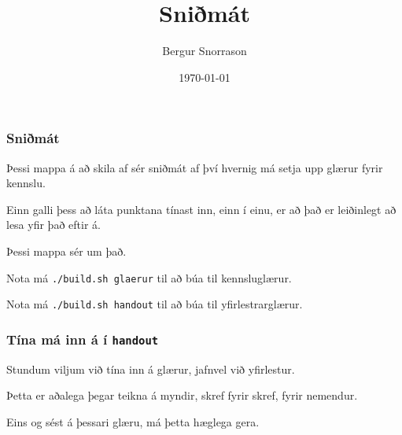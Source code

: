 \title{Sniðmát}
\author{Bergur Snorrason}
\date{\today}



\frame{\titlepage}

{
	\frametitle{Sniðmát}
	{
		\item<1-> Þessi mappa á að skila af sér sniðmát af því hvernig má setja upp glærur fyrir kennslu.
		\item<3-> Einn galli þess að láta punktana tínast inn, einn í einu, er að það er leiðinlegt að lesa yfir það eftir á.
		\item<5-> Þessi mappa sér um það.
		\item<6-> Nota má \texttt{./build.sh glaerur} til að búa til kennsluglærur.
		\item<7-> Nota má \texttt{./build.sh handout} til að búa til yfirlestrarglærur.
	}
}

{
	\frametitle{Tína má inn á í \texttt{handout}}
	{
		\item<all:1-> Stundum viljum við tína inn á glærur, jafnvel við yfirlestur.
		\item<all:2-> Þetta er aðalega þegar teikna á myndir, skref fyrir skref, fyrir nemendur.
		\item<all:3-> Eins og sést á þessari glæru, má þetta hæglega gera.
	}
}


